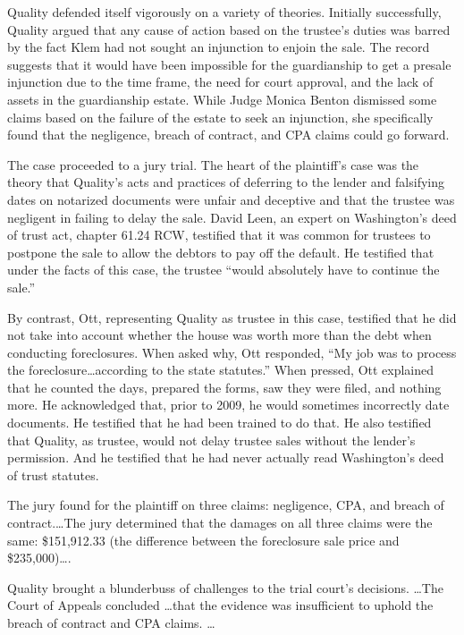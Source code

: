 Quality defended itself vigorously on a variety of theories. Initially
successfully, Quality argued that any cause of action based on the trustee's
duties was barred by the fact Klem had not sought an injunction to enjoin the
sale. The record suggests that it would have been impossible for the
guardianship to get a presale injunction due to the time frame, the need for
court approval, and the lack of assets in the guardianship estate. While Judge
Monica Benton dismissed some claims based on the failure of the estate to seek
an injunction, she specifically found that the negligence, breach of contract,
and CPA claims could go forward.

The case proceeded to a jury trial. The heart of the plaintiff's case
was the theory that Quality's acts and practices of deferring to the lender and
falsifying dates on notarized documents were unfair and deceptive and that the
trustee was negligent in failing to delay the sale. David Leen, an expert on
Washington's deed of trust act, chapter 61.24 RCW, testified that it was common
for trustees to postpone the sale to allow the debtors to pay off the default.
He testified that under the facts of this case, the trustee ``would absolutely
have to continue the sale.'' 

By contrast, Ott, representing Quality as trustee in this case,
testified that he did not take into account whether the house was worth more
than the debt when conducting foreclosures. When asked why, Ott responded, ``My
job was to process the foreclosure\dots according to the state statutes.''
When pressed, Ott explained that he counted the days, prepared the forms, saw
they were filed, and nothing more. He acknowledged that, prior to 2009, he
would sometimes incorrectly date documents. He testified that he had been
trained to do that. He also testified that Quality, as trustee, would not delay
trustee sales without the lender's permission. And he testified that he had
never actually read Washington's deed of trust statutes. 

The jury found for the plaintiff on three claims: negligence, CPA, and
breach of contract.\dots The jury determined that the damages on all three
claims were the same: \$151,912.33 (the difference between the foreclosure sale
price and \$235,000)\dots.

Quality brought a blunderbuss of challenges to the trial court's
decisions. \dots The Court of Appeals concluded \dots that the evidence was
insufficient to uphold the breach of contract and CPA claims. \dots 

